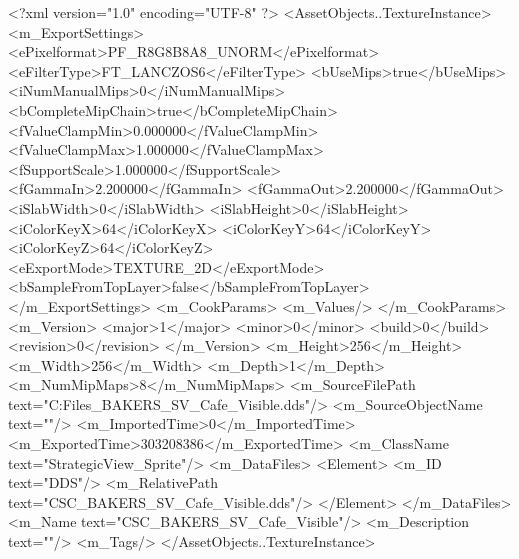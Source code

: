 <?xml version="1.0" encoding="UTF-8" ?>
<AssetObjects..TextureInstance>
	<m_ExportSettings>
		<ePixelformat>PF_R8G8B8A8_UNORM</ePixelformat>
		<eFilterType>FT_LANCZOS6</eFilterType>
		<bUseMips>true</bUseMips>
		<iNumManualMips>0</iNumManualMips>
		<bCompleteMipChain>true</bCompleteMipChain>
		<fValueClampMin>0.000000</fValueClampMin>
		<fValueClampMax>1.000000</fValueClampMax>
		<fSupportScale>1.000000</fSupportScale>
		<fGammaIn>2.200000</fGammaIn>
		<fGammaOut>2.200000</fGammaOut>
		<iSlabWidth>0</iSlabWidth>
		<iSlabHeight>0</iSlabHeight>
		<iColorKeyX>64</iColorKeyX>
		<iColorKeyY>64</iColorKeyY>
		<iColorKeyZ>64</iColorKeyZ>
		<eExportMode>TEXTURE_2D</eExportMode>
		<bSampleFromTopLayer>false</bSampleFromTopLayer>
	</m_ExportSettings>
	<m_CookParams>
		<m_Values/>
	</m_CookParams>
	<m_Version>
		<major>1</major>
		<minor>0</minor>
		<build>0</build>
		<revision>0</revision>
	</m_Version>
	<m_Height>256</m_Height>
	<m_Width>256</m_Width>
	<m_Depth>1</m_Depth>
	<m_NumMipMaps>8</m_NumMipMaps>
	<m_SourceFilePath text="C:\Users\Shadow\Desktop\Working Files\Icons\StrategicView\CSC_BAKERS_SV_Cafe_Visible.dds"/>
	<m_SourceObjectName text=""/>
	<m_ImportedTime>0</m_ImportedTime>
	<m_ExportedTime>303208386</m_ExportedTime>
	<m_ClassName text="StrategicView_Sprite"/>
	<m_DataFiles>
		<Element>
			<m_ID text="DDS"/>
			<m_RelativePath text="CSC_BAKERS_SV_Cafe_Visible.dds"/>
		</Element>
	</m_DataFiles>
	<m_Name text="CSC_BAKERS_SV_Cafe_Visible"/>
	<m_Description text=""/>
	<m_Tags/>
</AssetObjects..TextureInstance>

